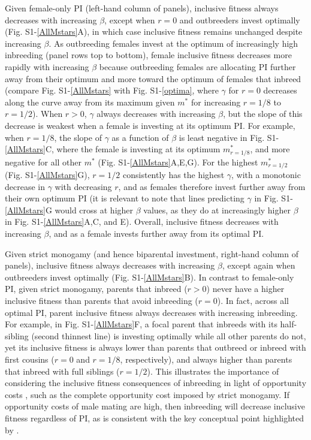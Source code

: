 \documentclass[12pt]{article}
\begin{document}
Given female-only PI (left-hand column of panels), inclusive fitness always decreases with increasing $\beta$, except when $r=0$ and outbreeders invest optimally (Fig. S1-\ref{AllMstars}A), in which case inclusive fitness remains unchanged despite increasing $\beta$. As outbreeding females invest at the optimum of increasingly high inbreeding (panel rows top to bottom), female inclusive fitness decreases more rapidly with increasing $\beta$ because outbreeding females are allocating PI further away from their optimum and more toward the optimum of females that inbreed (compare Fig. S1-\ref{AllMstars} with Fig. S1-\ref{optima}, where $\gamma$ for $r=0$ decreases along the curve away from its maximum given $m^{*}$ for increasing $r=1/8$ to $r=1/2$). When $r>0$, $\gamma$ always decreases with increasing $\beta$, but the slope of this decrease is weakest when a female is investing at its optimum PI. For example, when $r=1/8$, the slope of $\gamma$ as a function of $\beta$ is least negative in Fig. S1-\ref{AllMstars}C, where the female is investing at its optimum $m^{*}_{r=1/8}$, and more negative for all other $m^{*}$ (Fig. S1-\ref{AllMstars}A,E,G). For the highest $m^{*}_{r=1/2}$ (Fig. S1-\ref{AllMstars}G), $r=1/2$ consistently has the highest $\gamma$, with a monotonic decrease in $\gamma$ with decreasing $r$, and as females therefore invest further away from their own optimum PI (it is relevant to note that lines predicting $\gamma$ in Fig. S1-\ref{AllMstars}G would cross at higher $\beta$ values, as they do at increasingly higher $\beta$ in Fig. S1-\ref{AllMstars}A,C, and E). Overall, inclusive fitness decreases with increasing $\beta$, and as a female invests further away from its optimal PI.

Given strict monogamy (and hence biparental investment, right-hand column of panels), inclusive fitness always decreases with increasing $\beta$, except again when outbreeders invest optimally (Fig. S1-\ref{AllMstars}B). In contrast to female-only PI, given strict monogamy, parents that inbreed ($r>0$) never have a higher inclusive fitness than parents that avoid inbreeding ($r=0$). In fact, across all optimal PI, parent inclusive fitness always decreases with increasing inbreeding. For example, in Fig. S1-\ref{AllMstars}F, a focal parent that inbreeds with its half-sibling (second thinnest line) is investing optimally while all other parents do not, yet its inclusive fitness is always lower than parents that outbreed or inbreed with first cousins ($r=0$ and $r=1/8$, respectively), and always higher than parents that inbreed with full siblings ($r=1/2$). This illustrates the importance of considering the inclusive fitness consequences of inbreeding in light of opportunity costs \cite[][]{Waser1986}, such as the complete opportunity cost imposed by strict monogamy. If opportunity costs of male mating are high, then inbreeding will decrease inclusive fitness regardless of PI, as is consistent with the key conceptual point highlighted by \cite{Waser1986}.
\end{document}
